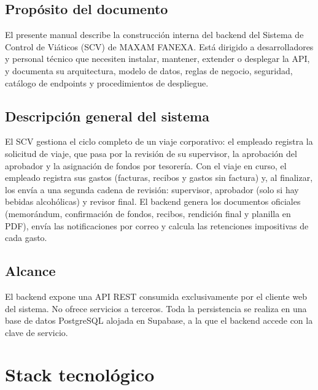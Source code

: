\documentclass[11pt,letterpaper]{article}
\begin{document}
\subsection{Propósito del documento}
El presente manual describe la construcción interna del backend del Sistema de Control de Viáticos (SCV) de MAXAM FANEXA. Está dirigido a desarrolladores y personal técnico que necesiten instalar, mantener, extender o desplegar la API, y documenta su arquitectura, modelo de datos, reglas de negocio, seguridad, catálogo de endpoints y procedimientos de despliegue.

\subsection{Descripción general del sistema}
El SCV gestiona el ciclo completo de un viaje corporativo: el empleado registra la solicitud de viaje, que pasa por la revisión de su supervisor, la aprobación del aprobador y la asignación de fondos por tesorería. Con el viaje en curso, el empleado registra sus gastos (facturas, recibos y gastos sin factura) y, al finalizar, los envía a una segunda cadena de revisión: supervisor, aprobador (solo si hay bebidas alcohólicas) y revisor final. El backend genera los documentos oficiales (memorándum, confirmación de fondos, recibos, rendición final y planilla en PDF), envía las notificaciones por correo y calcula las retenciones impositivas de cada gasto.

\subsection{Alcance}
El backend expone una API REST consumida exclusivamente por el cliente web del sistema. No ofrece servicios a terceros. Toda la persistencia se realiza en una base de datos PostgreSQL alojada en Supabase, a la que el backend accede con la clave de servicio.

\section{Stack tecnológico}
\end{document}
